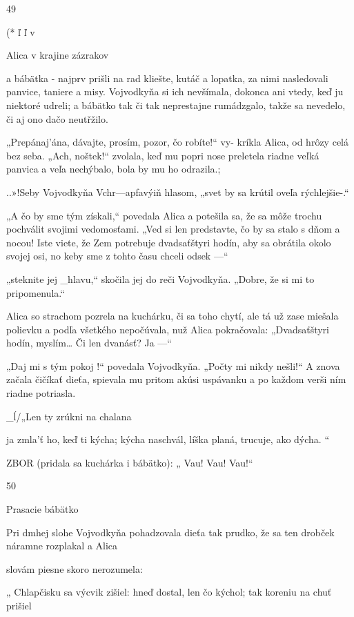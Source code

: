 \documentclass[12pt]{article}
\begin{document}
\begin{Parallel}[p]{}{}
{{49

  

(*
ľ
ľ
v

 

Alica v krajine zázrakov

a bábätka - najprv prišli na rad kliešte, kutáč a lopatka, za
nimi nasledovali panvice, taniere a misy. Vojvodkyňa si ich
nevšímala, dokonca ani vtedy, keď ju niektoré udreli;
a bábätko tak či tak neprestajne rumádzgalo, takže sa
nevedelo, či aj ono dačo neutřžilo.

„Prepánaj'ána, dávajte, prosím, pozor, čo robíte!“ vy-
kríkla Alica, od hrôzy celá bez seba. „Ach, noštek!“ zvolala,
keď mu popri nose preletela riadne veľká panvica a veľa
nechýbalo, bola by mu ho odrazila.; \;

..»!Seby %
Vojvodkyňa Vchr—apfavýiň hlasom, „svet by sa krútil oveľa
rýchlejšie-.“

„A čo by sme tým získali,“ povedala Alica a potešila sa,
že sa môže trochu pochválit svojimi vedomosťami. „Ved si
len predstavte, čo by sa stalo s dňom a nocou! Iste viete, že
Zem potrebuje dvadsaťštyri hodín, aby sa obrátila okolo
svojej osi, no keby sme z tohto času chceli odsek —“

„steknite jej _hlavu,“ skočila jej do reči Vojvodkyňa.
„Dobre, že si mi to pripomenula.“

Alica so strachom pozrela na kuchárku, či sa toho chytí,
ale tá už zase miešala polievku a podľa všetkého nepočúvala,
nuž Alica pokračovala: „Dvadsaťštyri hodín, myslím… Či
len dvanásť? Ja —“

„Daj mi s tým pokoj !“ povedala Vojvodkyňa. „Počty mi
nikdy nešli!“ A znova začala čičíkať dieťa, spievala mu
pritom akúsi uspávanku a po každom verši ním riadne
potriasla.

_ĺ/„Len ty zrúkni na chalana

ja zmla'ť ho, keď ti kýcha;
kýcha naschvál, líška planá,
trucuje, ako dýcha. “

ZBOR
(pridala sa kuchárka i bábätko):
„ Vau! Vau! Vau!“

50

Prasacie bábätko

Pri dmhej slohe Vojvodkyňa pohadzovala dieťa tak
prudko, že sa ten drobček náramne rozplakal a Alica

slovám piesne skoro nerozumela:

„ Chlapčisku sa výcvik zišiel:
hneď dostal, len čo kýchol;
tak koreniu na chuť prišiel

}}
\end{Parallel}
\end{document}
